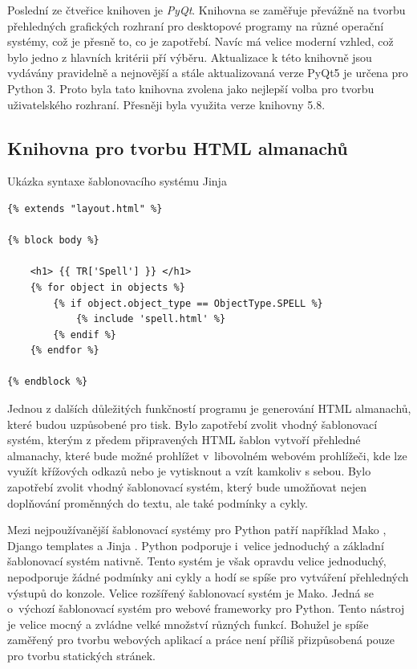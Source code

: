 \documentclass[thesis=B,czech]{resources/FITthesis}[2012/06/26]
\begin{document}
Poslední ze čtveřice knihoven je \textit{PyQt}. Knihovna se zaměřuje převážně na tvorbu přehledných grafických rozhraní pro desktopové programy na různé operační systémy, což je přesně to, co je zapotřebí. Navíc má velice moderní vzhled, což bylo jedno z hlavních kritérii pří výběru. Aktualizace k této knihovně jsou vydávány pravidelně a nejnovější a stále aktualizovaná verze PyQt5 je určena pro Python 3. Proto byla tato knihovna zvolena jako nejlepší volba pro tvorbu uživatelského rozhraní. Přesněji byla využita verze knihovny 5.8.
\subsection{Knihovna pro tvorbu HTML almanachů}
\begin{listing}[htbp]
\caption{\label{code:jinja}Ukázka syntaxe šablonovacího systému Jinja}
\begin{verbatim}
{% extends "layout.html" %}

{% block body %}

    <h1> {{ TR['Spell'] }} </h1>
    {% for object in objects %}
        {% if object.object_type == ObjectType.SPELL %}
            {% include 'spell.html' %}
        {% endif %}
    {% endfor %}
    
{% endblock %}

\end{verbatim}
\end{listing}
Jednou z dalších důležitých funkčností programu je generování HTML almanachů, které budou uzpůsobené pro tisk. Bylo zapotřebí zvolit vhodný šablonovací systém, kterým z předem připravených HTML šablon vytvoří přehledné almanachy, které bude možné prohlížet v~libovolném webovém prohlížeči, kde lze využít křížových odkazů nebo je vytisknout a vzít kamkoliv s sebou. Bylo zapotřebí zvolit vhodný šablonovací systém, který bude umožňovat nejen doplňování proměnných do textu, ale také podmínky a cykly.\par

Mezi nejpoužívanější šablonovací systémy pro Python patří například Mako \cite{mako}, Django templates a Jinja \cite{jinja}. Python podporuje i~velice jednoduchý a základní šablonovací systém nativně. Tento systém je však opravdu velice jednoduchý, nepodporuje žádné podmínky ani cykly a hodí se spíše pro vytváření přehledných výstupů do konzole. Velice rozšířený šablonovací systém je Mako. Jedná se o~výchozí šablonovací systém pro webové frameworky pro Python. Tento nástroj je velice mocný a zvládne velké množství různých funkcí. Bohužel je spíše zaměřený pro tvorbu webových aplikací a práce není příliš přizpůsobená pouze pro tvorbu statických stránek.\par
\end{document}
